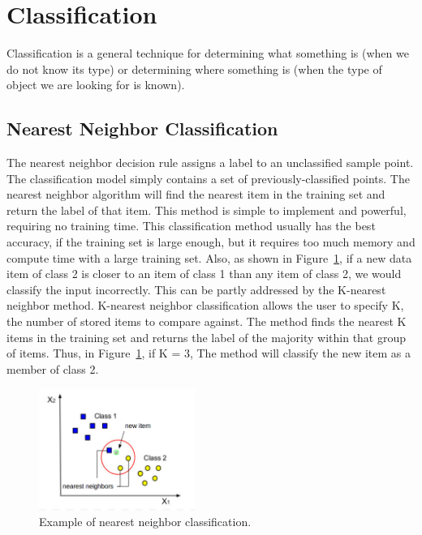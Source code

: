 \section{Classification}
\label{Classification}
Classification is a general technique for determining what something is (when we do not know its type) or determining where something is (when the type of object we are looking for is known).

\subsection{Nearest Neighbor Classification}
The nearest neighbor decision rule assigns a label to an unclassified sample point. The classification model simply contains a set of previously-classified points. The nearest neighbor algorithm will find the nearest item in the training set and return the label of that item. This method is simple to implement and powerful, requiring no training time. This classification method usually has the best accuracy, if the training set is large enough, but it requires too much memory and compute time with a large training set. Also, as shown in Figure~\ref{fig:knn}, if a new data item of class 2 is closer to an item of class 1 than any item of class 2, we would classify the input incorrectly. This can be partly addressed by the K-nearest neighbor method. K-nearest neighbor classification allows the user to specify K, the number of stored items to compare against. The method finds the nearest K items in the training set and returns the label of the majority within that group of items. Thus, in Figure~\ref{fig:knn}, if K = 3, The method will classify the new item as a member of class 2.  

\begin{figure}[t]
  \centering
  \includegraphics[width=2in]{figures/knn.jpg}   
  \caption[Example of nearest neighbor classification]{Example of nearest neighbor classification.}
  \label{fig:knn}
\end{figure}

